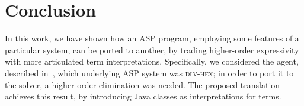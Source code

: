 \section{Conclusion}
\label{sec:conc}

In this work, we have shown how an ASP program, employing some features of a particular system, can be ported to another, by trading higher-order expressivity with more articulated term interpretations.
Specifically, we considered the \ah agent, described in~\cite{angryhex}, which underlying ASP system was \textsc{dlv-hex}; in order to port it to the \al solver, a higher-order elimination was needed.
The proposed translation achieves this result, by introducing Java classes as interpretations for terms. 


